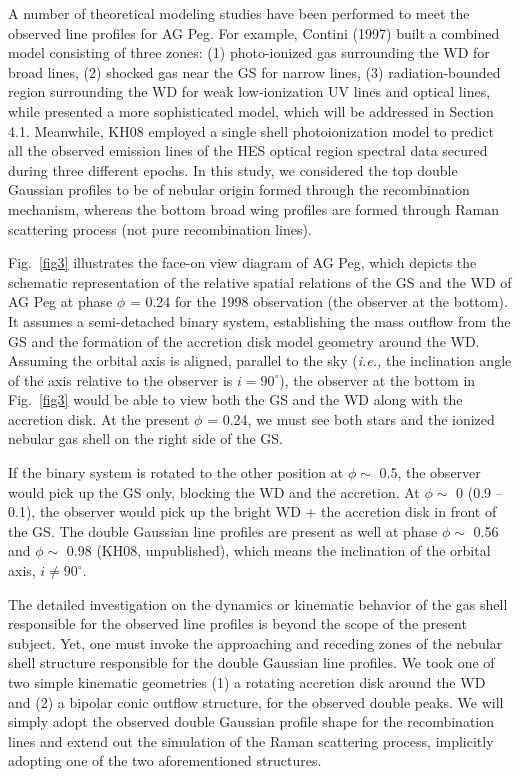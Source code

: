 \documentclass[a4paper,fleqn,usenatbib,useAMS]{mnras}
\def\ie{{\it i.e.,} }
\begin{document}
{A number of theoretical modeling studies have been performed to meet the observed line profiles for AG Peg. For example, Contini (1997) built a combined model consisting of three zones: (1) photo-ionized gas surrounding the WD for broad lines, (2)  shocked gas near the GS for narrow lines, (3) radiation-bounded region surrounding the WD for weak low-ionization UV lines and optical lines, while  \citet{eri04}  presented a more sophisticated model, which will be addressed in Section 4.1. Meanwhile, KH08 employed a single shell photoionization model to predict all the observed emission lines of the HES optical region spectral data secured during three different epochs. In this study, we considered the top double Gaussian profiles to be of nebular origin formed through the recombination mechanism, whereas the bottom broad wing profiles are formed through  Raman scattering process (not pure recombination lines).

Fig.~\ref{fig3} illustrates the face-on view diagram of AG Peg, which depicts the schematic representation of the relative spatial relations of the GS and the WD of AG Peg at phase $\phi$ = 0.24 for the 1998 observation (the observer at the bottom). It assumes a semi-detached binary system, establishing the mass outflow from the GS and the formation of the accretion disk model geometry around the WD.
Assuming the orbital axis is aligned, parallel  to the sky (\ie the inclination angle of the axis relative to the observer  is $i = 90^{\circ}$), the observer at the bottom  in Fig.~\ref{fig3} would be able to view both the GS and the WD along with the accretion disk. At the present $\phi$ = 0.24, we  must see both stars and the ionized nebular gas shell on the right side of the GS.

If the binary system is rotated to the other position at $\phi \sim$ 0.5, the observer would pick up the GS only, blocking the WD and the accretion. At $\phi \sim$ 0 (0.9 -- 0.1), the observer would pick up the bright WD + the accretion disk in front of the GS. The double Gaussian line profiles are present as well at phase $\phi \sim$ 0.56 and $\phi \sim$ 0.98 (KH08, unpublished), which means the inclination of the orbital axis, $i \neq 90^{\circ}$.

The detailed investigation on the dynamics or kinematic behavior of the gas shell responsible for the observed line profiles is beyond the scope of the present subject. Yet, one must invoke the approaching and receding zones of the nebular shell structure responsible for the double Gaussian line profiles.
We took one of two simple kinematic geometries (1) a rotating accretion disk around the WD and (2) a bipolar conic outflow structure, for the observed double peaks.
We will simply adopt the observed double Gaussian profile shape for the recombination lines and extend out the simulation of the Raman scattering process, implicitly adopting one of the two aforementioned structures.


}
\end{document}
